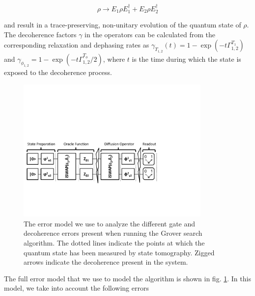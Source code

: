 \begin{equation}
\rho \to E_1 \rho E_1^\dagger+E_2 \rho E_2^\dagger
\end{equation}

and result in a trace-preserving, non-unitary evolution of the quantum state of $\rho$. The decoherence factors $\gamma$ in the operators can be calculated from the corresponding relaxation and dephasing rates as $\gamma_{T_{1,2}}(t) = 1-\exp{\left(-t \Gamma_{1,2}^{T_1}\right)}$ and $\gamma_{\phi_{1,2}} = 1-\exp{\left(-t \Gamma_{1,2}^{T_\phi}/2\right)}$, where $t$ is the time during which the state is exposed to the decoherence process.

\smallskip

\begin{figure}[ht!]
	\centering
		\includegraphics[width=0.85\textwidth]{"./material/papers/grover/grover_error_model"}
	\caption[Error model used for analyzing gate and decoherence errors for the Grover search algorithm]{The error model we use to analyze the different gate and decoherence errors present when running the Grover search algorithm. The dotted lines indicate the points at which the quantum state has been measured by state tomography. Zigged arrows indicate the decoherence present in the system.}
	\label{fig:GroverErrorModel}
\end{figure}


The full error model that we use to model the algorithm is shown in fig. \ref{fig:GroverErrorModel}. In this model, we take into account the following errors

